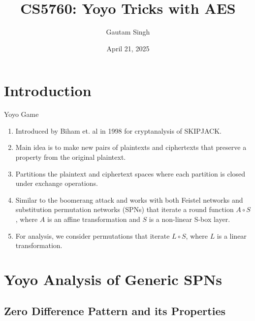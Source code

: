 \documentclass[notheorems]{beamer}
\title[Cryptanalysis of DES]{CS5760: Yoyo Tricks with AES}
\date{April 21, 2025}
\author{Gautam Singh}
\institute[IITH]{Indian Institute of Technology Hyderabad}
\theoremstyle{definition}
\theoremstyle{example}
\begin{document}
    
    \begin{frame}
        \titlepage
    \end{frame}
    
    \begin{frame}
        \tableofcontents
    \end{frame}
    
    \section{Introduction}
    \label{sec:intro}
    
    \begin{frame}{Yoyo Game}
        \begin{enumerate}
            \item<1-> Introduced by Biham et. al in 1998 for cryptanalysis of
            SKIPJACK. %
            \item<2-> Main idea is to make new pairs of plaintexts and
            ciphertexts that preserve a property from the original plaintext.
            \item<3-> Partitions the plaintext and ciphertext spaces where each
            partition is closed under exchange operations.
            \item<4-> Similar to the boomerang attack and works with both
            Feistel networks and substitution permutation networks (SPNs) that
            iterate a round function \(A \circ S\), where \(A\) is an affine
            transformation and \(S\) is a non-linear S-box layer.
            \item<5-> For analysis, we consider permutations that iterate \(L
            \circ S\), where \(L\) is a linear transformation.
        \end{enumerate}
    \end{frame}

    \section{Yoyo Analysis of Generic SPNs}
    \label{sec:yoyo-generic-analysis}

    \subsection{Zero Difference Pattern and its Properties}
    \label{subsec:zero-diff-pattern}
    
\end{document}
